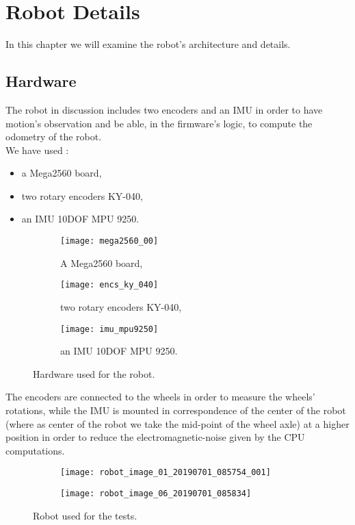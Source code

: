 \chapter{Robot Details}

In this chapter we will examine the robot's architecture and details.

\section{Hardware}

The robot in discussion includes two encoders and an IMU in order to have motion's observation and be able, in the firmware's logic, to compute the odometry of the robot.\\
We have used :
\begin{itemize}
	\item a Mega2560 board\supercite{mega2560_datasheet},
	\item two rotary encoders KY-040\supercite{enc_datasheet},
	\item an IMU 10DOF MPU 9250\supercite{imu_prod_spec}.
\end{itemize}


\begin{figure}[htb]
 \centering
	\begin{subfigure}{0.3\textwidth}
		\texttt{[image: mega2560\_00]}
		\captionsetup{justification=centering}
		\caption{A Mega2560 board,}
	\end{subfigure}\hfil
	\begin{subfigure}{0.3\textwidth}
		\texttt{[image: encs\_ky\_040]}
		\captionsetup{justification=centering}
		\caption{two rotary encoders KY-040,}
	\end{subfigure}\hfil
	\begin{subfigure}{0.3\textwidth}
		\texttt{[image: imu\_mpu9250]}
		\captionsetup{justification=centering}
		\caption{an IMU 10DOF MPU 9250.}
	\end{subfigure}
	\captionsetup{justification=centering, margin=1.5cm}
	\centering
	\caption{Hardware used for the robot.}
\end{figure}
The encoders are connected to the wheels in order to measure the wheels' rotations, while the IMU is mounted in correspondence of the center of the robot (where as center of the robot we take the mid-point of the wheel axle) at a higher position in order to reduce the electromagnetic-noise given by the CPU computations.\\
\begin{figure}[htb]
 \centering
	\begin{subfigure}{0.43\textwidth}
		\texttt{[image: robot\_image\_01\_20190701\_085754\_001]}
	\end{subfigure}\hfil
	\begin{subfigure}{0.47\textwidth}
		\texttt{[image: robot\_image\_06\_20190701\_085834]}
	\end{subfigure}
	\captionsetup{justification=centering, margin=1.5cm}
	\centering
	\caption{Robot used for the tests.}
\end{figure}


